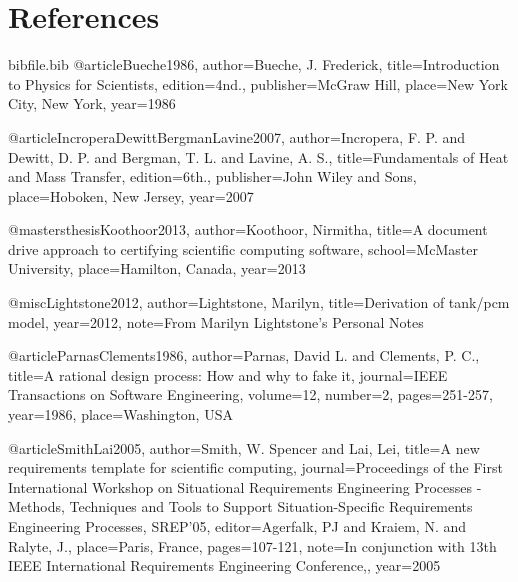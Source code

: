 \documentclass[12pt]{article}
\begin{document}
\section{References}
\label{Sec:References}
\begin{filecontents*}{bibfile.bib}
@article{Bueche1986,
author={Bueche, J. Frederick},
title={Introduction to Physics for Scientists},
edition={4nd.},
publisher={McGraw Hill},
place={New York City, New York},
year={1986}}

@article{IncroperaDewittBergmanLavine2007,
author={Incropera, F. P. and Dewitt, D. P. and Bergman, T. L. and Lavine, A. S.},
title={Fundamentals of Heat and Mass Transfer},
edition={6th.},
publisher={John Wiley and Sons},
place={Hoboken, New Jersey},
year={2007}}

@mastersthesis{Koothoor2013,
author={Koothoor, Nirmitha},
title={A document drive approach to certifying scientific computing software},
school={McMaster University},
place={Hamilton, Canada},
year={2013}}

@misc{Lightstone2012,
author={Lightstone, Marilyn},
title={Derivation of tank/pcm model},
year={2012},
note={From Marilyn Lightstone's Personal Notes}}

@article{ParnasClements1986,
author={Parnas, David L. and Clements, P. C.},
title={A rational design process: How and why to fake it},
journal={IEEE Transactions on Software Engineering},
volume={12},
number={2},
pages={251-257},
year={1986},
place={Washington, USA}}

@article{SmithLai2005,
author={Smith, W. Spencer and Lai, Lei},
title={A new requirements template for scientific computing},
journal={Proceedings of the First International Workshop on Situational Requirements Engineering Processes - Methods, Techniques and Tools to Support Situation-Specific Requirements Engineering Processes, SREP'05},
editor={Agerfalk, PJ and Kraiem, N. and Ralyte, J.},
place={Paris, France},
pages={107-121},
note={In conjunction with 13th IEEE International Requirements Engineering Conference,},
year={2005}}
\end{filecontents*}
\nocite{*}
\printbibliography[heading=none]
\end{document}
